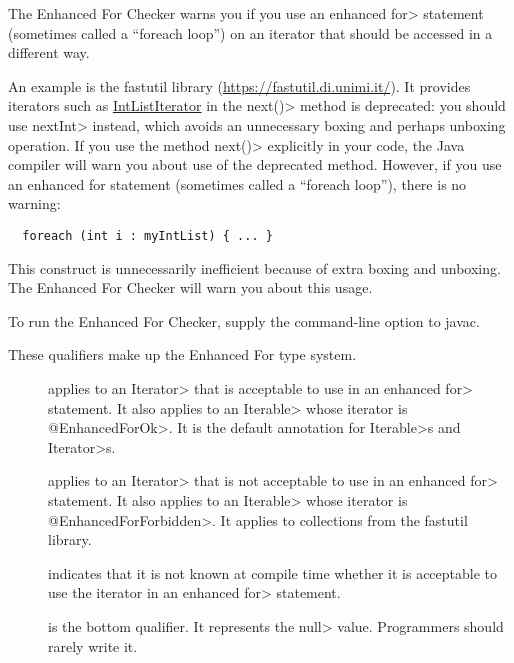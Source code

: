 \htmlhr
{}

The Enhanced For Checker warns you if you use an enhanced \<for> statement
(sometimes called a ``foreach loop'') on an iterator that should be
accessed in a different way.

An example is the fastutil library (\url{https://fastutil.di.unimi.it/}).
It provides iterators such as
\href{https://fastutil.di.unimi.it/docs/it/unimi/dsi/fastutil/ints/IntListIterator.html}{\<IntListIterator\>}
in the \< next()> method is deprecated:  you should use \<nextInt> instead,
which avoids an unnecessary boxing and perhaps unboxing operation.  If you use the
method \<next()> explicitly in your code, the Java compiler will warn you
about use of the deprecated method.  However, if you use an enhanced for
statement (sometimes called a ``foreach loop''), there is no warning:

\begin{Verbatim}
  foreach (int i : myIntList) { ... }
\end{Verbatim}

\noindent
This construct is unnecessarily inefficient because of extra boxing and unboxing.
The Enhanced For Checker will warn you about this usage.

To run the Enhanced For Checker, supply the
command-line option to javac.



These qualifiers make up the Enhanced For type system.

\begin{description}

\item[]
  applies to an \<Iterator> that is acceptable to use in an enhanced \<for>
  statement.
  It also applies to an \<Iterable> whose iterator is \<@EnhancedForOk>.
  It is the default annotation for \<Iterable>s and \<Iterator>s.

\item[]
  applies to an \<Iterator> that is not acceptable to use in an enhanced \<for>
  statement.
  It also applies to an \<Iterable> whose iterator is \<@EnhancedForForbidden>.
  It applies to collections from the fastutil library.

\item[]
  indicates that it is not known at compile time whether it is acceptable
  to use the iterator in an enhanced \<for> statement.

\item[]
  is the bottom qualifier.  It represents the \<null> value.  Programmers
  should rarely write it.

\end{description}

